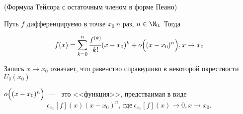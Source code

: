 \begin{theorem}
	\hypertarget{thrm7.1}{(Формула Тейлора с остаточным членом в форме Пеано)} Путь $f$ дифференцируемо в точке $x_{0} \ n$ раз, $n \in \N_{0.}$ Тогда 
	
	$$f(x) = \sum\limits_{k = 0}^n \cfrac{f^{(k)}}{k!}(x-x_{0})^{k} + o\Bigl( (x-x_{0})^{n} \Bigr), x \to x_{0}$$
\begin{note}
	Запись $x\to x_{0}$ означает, что равенство справедливо в некоторой окрестности $U_{\delta}(x_{0})$
	
	$o\Bigl( (x-x_{0})^{n} \Bigr)$~---~ это <<функция>>, предстваимая в виде $$\epsilon_{x_{0}}[f](x)(x-x_{0})^{n}, \ \textrm{где} \ \epsilon_{x_{0}}[f](x) \to 0, x\to x_{0}.$$
\end{note}	

\end{theorem}
